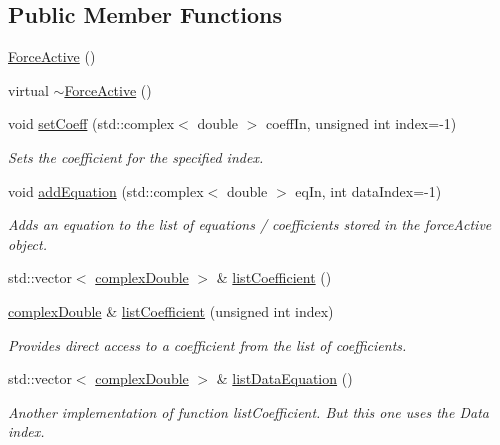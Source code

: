 \subsection*{Public Member Functions}
\begin{DoxyCompactItemize}
\item 
\hyperlink{classosea_1_1ofreq_1_1_force_active_ae006e3394f8c925c6a3218686c5cc8ae}{Force\-Active} ()
\item 
virtual \hyperlink{classosea_1_1ofreq_1_1_force_active_aa2db4bc1fb74ecb6e0ee46c59a40dd2a}{$\sim$\-Force\-Active} ()
\item 
void \hyperlink{classosea_1_1ofreq_1_1_force_active_a488373dc9f5d8f5b07cee3615a2390fe}{set\-Coeff} (std\-::complex$<$ double $>$ coeff\-In, unsigned int index=-\/1)
\begin{DoxyCompactList}\small\item\em Sets the coefficient for the specified index. \end{DoxyCompactList}\item 
void \hyperlink{classosea_1_1ofreq_1_1_force_active_a6c63d2be73033f1c061fd71ce9d58065}{add\-Equation} (std\-::complex$<$ double $>$ eq\-In, int data\-Index=-\/1)
\begin{DoxyCompactList}\small\item\em Adds an equation to the list of equations / coefficients stored in the force\-Active object. \end{DoxyCompactList}\item 
std\-::vector$<$ \hyperlink{namespaceosea_1_1ofreq_a40cad4695a41123a7ae6ab0b6e8b1664}{complex\-Double} $>$ \& \hyperlink{classosea_1_1ofreq_1_1_force_active_a6cc1157859625b457b82ff745f0b5ff4}{list\-Coefficient} ()
\item 
\hyperlink{namespaceosea_1_1ofreq_a40cad4695a41123a7ae6ab0b6e8b1664}{complex\-Double} \& \hyperlink{classosea_1_1ofreq_1_1_force_active_aac0948404f2f21b013b9a02b38087191}{list\-Coefficient} (unsigned int index)
\begin{DoxyCompactList}\small\item\em Provides direct access to a coefficient from the list of coefficients. \end{DoxyCompactList}\item 
std\-::vector$<$ \hyperlink{namespaceosea_1_1ofreq_a40cad4695a41123a7ae6ab0b6e8b1664}{complex\-Double} $>$ \& \hyperlink{classosea_1_1ofreq_1_1_force_active_a6c41c64d60a90442ab2caffcefe703f1}{list\-Data\-Equation} ()
\begin{DoxyCompactList}\small\item\em Another implementation of function list\-Coefficient. But this one uses the Data index. \end{DoxyCompactList}\item 

\end{DoxyCompactItemize}
